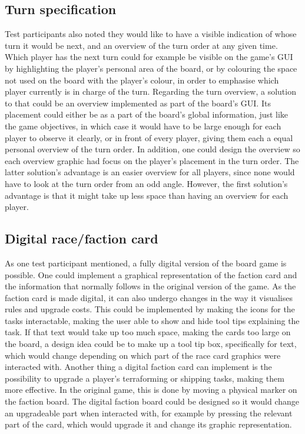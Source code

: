 \subsection{Turn specification}
Test participants also noted they would like to have a visible indication of whose turn it would be next, and an overview of the turn order at any given time. Which player has the next turn could for example be visible on the game's GUI by highlighting the player's personal area of the board, or by colouring the space not used on the board with the player's colour, in order to emphasise which player currently is in charge of the turn.
Regarding the turn overview, a solution to that could be an overview implemented as part of the board's GUI. Its placement could either be as a part of the board's global information, just like the game objectives, in which case it would have to be large enough for each player to observe it clearly, or in front of every player, giving them each a equal personal overview of the turn order. In addition, one could design the overview so each overview graphic had focus on the player's placement in the turn order. The latter solution's advantage is an easier overview for all players, since none would have to look at the turn order from an odd angle. However, the first solution's advantage is that it might take up less space than having an overview for each player.

\subsection{Digital race/faction card}\label{sec:DigiRaceFact}
As one test participant mentioned, a fully digital version of the board game is possible. One could implement a graphical representation of the faction card and the information that normally follows in the original version of the game. As the faction card is made digital, it can also undergo changes in the way it visualises rules and upgrade costs. This could be implemented by making the icons for the tasks interactable, making the user able to show and hide tool tips explaining the task. If that text would take up too much space, making the cards too large on the board, a design idea could be to make up a tool tip box, specifically for text, which would change depending on which part of the race card graphics were interacted with. Another thing a digital faction card can implement is the possibility to upgrade a player's terraforming or shipping tasks, making them more effective. In the original game, this is done by moving a physical marker on the faction board. The digital faction board could be designed so it would change an upgradeable part when interacted with, for example by pressing the relevant part of the card, which would upgrade it and change its graphic representation.

